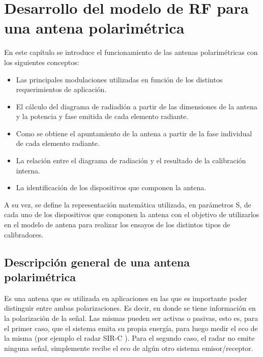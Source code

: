 
\chapter{Desarrollo del modelo de RF para una antena polarimétrica} %
\label{ch:phasedArray}

En este capítulo se introduce el funcionamiento de las antenas polarimétricas con los siguientes conceptos:
\begin{itemize}
	\item Las principales modulaciones utilizadas en función de los distintos requerimientos de aplicación.
	\item El cálculo del diagrama de radiadión a partir de las dimensiones de la antena y la potencia y fase emitida de cada 
		elemento radiante.
	\item Como se obtiene el apuntamiento de la antena a partir de la fase individual de cada elemento radiante. 
	\item La relación entre el diagrama de radiación y el resultado de la calibración interna. 
	\item La identificación de los dispositivos que componen la antena.
\end{itemize}

A su vez, se define la representación matemática utilizada, en parámetros S, de cada uno de los dispositivos que componen la 
antena con el objetivo de utilizarlos en el modelo de antena para realizar los ensayos de los distintos tipos de calibradores.


\section{Descripción general de una antena polarimétrica}

Es una antena que es utilizada en aplicaciones en las que es importante poder distinguir entre ambas polarizaciones. Es decir, 
en donde se tiene información en la polarización de la señal. Las mismas pueden ser activas o pasivas, esto es, para el primer
caso, que el sistema emita su propia energía, para luego medir el eco de la misma (por ejemplo el radar SIR-C 
\cite{Curlander1991}). Para el segundo caso, el radar no emite ninguna señal, simplemente recibe el eco de algún otro sistema 
emisor/receptor.

